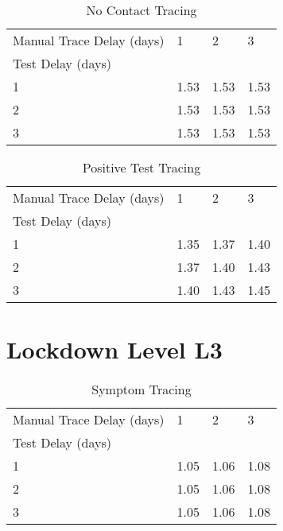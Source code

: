 \documentclass{article}
\begin{document}
    \begin{table}[H]
         \begin{tabular}{llll}
\toprule
Manual Trace Delay (days) &     1 &     2 &     3 \\
Test Delay (days) &       &       &       \\
\midrule
1                 &  1.53 &  1.53 &  1.53 \\
2                 &  1.53 &  1.53 &  1.53 \\
3                 &  1.53 &  1.53 &  1.53 \\
\bottomrule
\end{tabular}

        \caption{No Contact Tracing}
    \end{table}
    


    \begin{table}[H]
         \begin{tabular}{llll}
\toprule
Manual Trace Delay (days) &     1 &     2 &     3 \\
Test Delay (days) &       &       &       \\
\midrule
1                 &  1.35 &  1.37 &  1.40 \\
2                 &  1.37 &  1.40 &  1.43 \\
3                 &  1.40 &  1.43 &  1.45 \\
\bottomrule
\end{tabular}

        \caption{Positive Test Tracing}
    \end{table}
    

\clearpage

\section{Lockdown Level L3}


    \begin{table}[H]
         \begin{tabular}{llll}
\toprule
Manual Trace Delay (days) &     1 &     2 &     3 \\
Test Delay (days) &       &       &       \\
\midrule
1                 &  1.05 &  1.06 &  1.08 \\
2                 &  1.05 &  1.06 &  1.08 \\
3                 &  1.05 &  1.06 &  1.08 \\
\bottomrule
\end{tabular}

        \caption{Symptom Tracing}
    \end{table}
    
\end{document}
